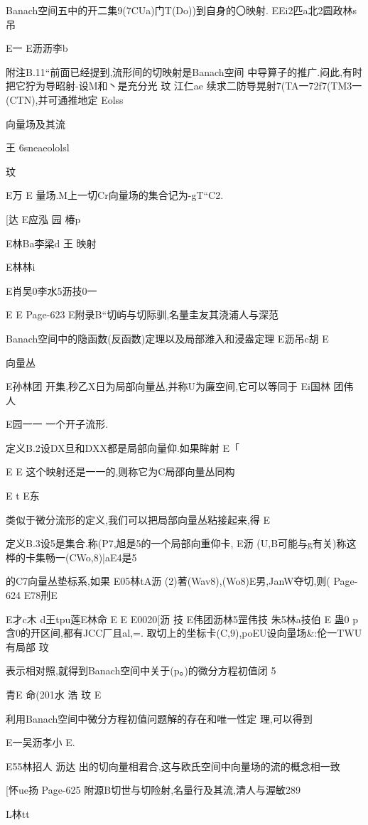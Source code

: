 Banach空间五中的开二集9(7CUa)门T(Do))到自身的〇映射.
EEi2匹a北2圆政林s吊

E一
E沥沥李b

附注B.11“前面已经提到,流形间的切映射是Banach空间
中导算子的推广.闷此,有时把它狞为导昭射-设M和丶是充分光
玟
江仁ae
续求二防导晃射7(TA一72f7(TM3一(CTN),并可通推地定
Eolss

向量场及其流

王
6sneaeololsl

玟

E万
E
量场.M上一切Cr向量场的集合记为-gT“C2.

[达
E应泓
园
椿p

E林Ba李梁d
王
映射

E林林i

E肖吴0李水5沥技0一

E
E
Page-623
E附录B“切屿与切际驯,名量圭友其浇浦人与深范

Banach空间中的隐函数(反函数)定理以及局部潍入和浸盎定理
E沥吊c胡
E

向量丛

E孙林团
开集,秒乙X日为局部向量丛,并称U为廉空间,它可以等同于
Ei国林
团伟
人

E园一一
一个开子流形.

定义B.2设DX旦和DXX都是局部向量仰.如果眸射
E「

E
E
这个映射还是一一的,则称它为C局邵向量丛同构

E
t
E东

类似于微分流形的定义,我们可以把局部向量丛粘接起来,得
E

定义B.3设5是集合.称(P7,旭是5的一个局部向重仰卡,
E沥
(U,B可能与g有关)称这桦的卡集畅一(CWo,8)|aE4是5

的C7向量丛垫标系,如果
E05林tA沥
(2)著(Wav8),(Wo8)E男,JanW夺切,则(
Page-624
E78刑E

E才c木
d王tpu莲E林命
E
E
E0020[沥
技
E伟团沥林5罡伟技
朱5林a技伯
E
蛊0
p
含0的开区间,都有JCC厂且al,=.
取切上的坐标卡(C,9),poEU设向量场&:伦一TWU有局部
玟

表示相对照,就得到Banach空间中关于(p。)的微分方程初值闭
5

青E
命(201水
浩
玟
E

利用Banach空间中微分方程初值问题解的存在和唯一性定
理,可以得到

E一吴沥孝小
E.

E55林招人
沥达
出的切向量相君合,这与欧氏空间中向量场的流的概念相一致

[怀ue扬
Page-625
附源B切世与切险射,名量行及其流,清人与渥敏289

L林tt

